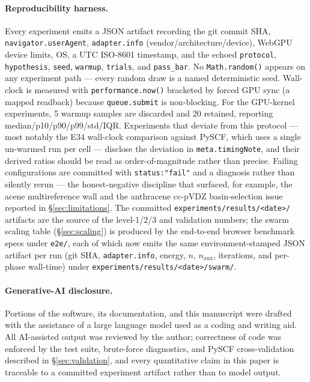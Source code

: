 \documentclass[11pt]{article}
\begin{document}
\paragraph{Reproducibility harness.} Every experiment emits a JSON artifact
recording the git commit SHA, \texttt{navigator.userAgent},
\texttt{adapter.info} (vendor/architecture/device), WebGPU device limits, OS, a
UTC ISO-8601 timestamp, and the echoed \texttt{protocol}, \texttt{hypothesis},
\texttt{seed}, \texttt{warmup}, \texttt{trials}, and \texttt{pass\_bar}. No
\texttt{Math.random()} appears on any experiment path --- every random draw is
a named deterministic seed. Wall-clock is measured with
\texttt{performance.now()} bracketed by forced GPU sync (a mapped readback)
because \texttt{queue.submit} is non-blocking. For the GPU-kernel experiments,
5 warmup samples are discarded and 20 retained, reporting
median/p10/p90/p99/std/IQR. Experiments that deviate from this protocol --- most
notably the E34 wall-clock comparison against PySCF, which uses a single
un-warmed run per cell --- disclose the deviation in \texttt{meta.timingNote},
and their derived ratios should be read as order-of-magnitude rather than
precise. Failing configurations
are committed with \texttt{status:"fail"} and a diagnosis rather than silently
rerun --- the honest-negative discipline that surfaced, for example, the acene
multireference wall and the anthracene cc-pVDZ basin-selection issue reported in
\S\ref{sec:limitations}. The committed \texttt{experiments/results/<date>/}
artifacts are the source of the level-1/2/3 and validation numbers; the swarm
scaling table (\S\ref{sec:scaling}) is produced by the end-to-end browser
benchmark specs under \texttt{e2e/}, each of which now emits the same
environment-stamped JSON artifact per run (git SHA, \texttt{adapter.info},
energy, $n$, $n_{\mathrm{aux}}$, iterations, and per-phase wall-time) under
\texttt{experiments/results/<date>/swarm/}.

\paragraph{Generative-AI disclosure.} Portions of the software, its
documentation, and this manuscript were drafted with the assistance of a large
language model used as a coding and writing aid. All AI-assisted output was
reviewed by the author; correctness of code was enforced by the test suite,
brute-force diagnostics, and PySCF cross-validation described in
\S\ref{sec:validation}, and every quantitative claim in this paper is traceable
to a committed experiment artifact rather than to model output.
\end{document}
